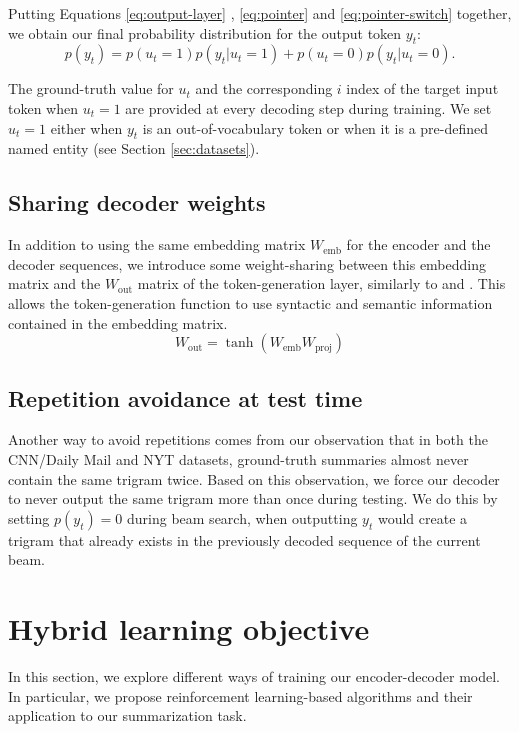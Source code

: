 \documentclass{article} \usepackage{iclr2018_arxiv,times}
\begin{document}
Putting Equations \ref{eq:output-layer} , \ref{eq:pointer} and \ref{eq:pointer-switch} together, we obtain our final probability distribution for the output token $y_t$:
\begin{equation}
p(y_t) = p(u_t = 1) p(y_t | u_t = 1) + p(u_t = 0) p(y_t | u_t = 0).
\label{eq:pointer-switch-softmax}
\end{equation}

The ground-truth value for $u_t$ and the corresponding $i$ index of the target input token when $u_t = 1$ are provided at every decoding step during training. We set $u_t = 1$ either when $y_t$ is an out-of-vocabulary token or when it is a pre-defined named entity (see Section \ref{sec:datasets}).

\subsection{Sharing decoder weights}
In addition to using the same embedding matrix $W_\textrm{emb}$ for the encoder and the decoder sequences, we introduce some weight-sharing between this embedding matrix and the $W_\textrm{out}$ matrix of the token-generation layer, similarly to \citet{inan2016} and \citet{press2016}. This allows the token-generation function to use syntactic and semantic information contained in the embedding matrix.
\begin{equation}
W_\textrm{out} = \tanh(W_\textrm{emb} W_\textrm{proj})
\label{eq:shared-softmax}
\end{equation}



\subsection{Repetition avoidance at test time}

Another way to avoid repetitions comes from our observation that in both the CNN/Daily Mail and NYT datasets, ground-truth summaries almost never contain the same trigram twice. Based on this observation, we force our decoder to never output the same trigram more than once during testing. We do this by setting $p(y_t) = 0$ during beam search, when outputting $y_t$ would create a trigram that already exists in the previously decoded sequence of the current beam.


\section{Hybrid learning objective}
\label{sec:learning-objective}
In this section, we explore different ways of training our encoder-decoder model. In particular, we propose reinforcement learning-based algorithms and their application to our summarization task.
 
\end{document}
